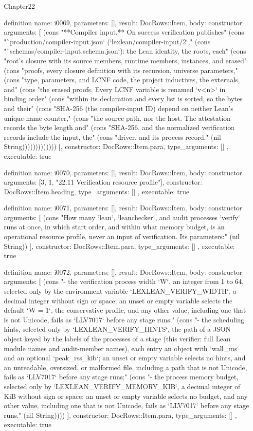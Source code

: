 \begin{lexlean}{Chapter22}
\begin{semanticmodule}
definition{
  name: i0069,
  parameters: [],
  result: DocRows::Item,
  body: constructor{
    arguments: [
      (cons "**Compiler input.** On success verification publishes" (cons "`production/compiler-input.json` (`lexlean/compiler-input/2`," (cons "`schemas/compiler-input.schema.json`): the Lean identity, the roots, each" (cons "root's closure with its source members, runtime members, instances, and erased" (cons "proofs, every closure definition with its recursion, universe parameters," (cons "type, parameters, and LCNF code, the project inductives, the externals, and" (cons "the erased proofs. Every LCNF variable is renamed `v<n>` in binding order" (cons "within its declaration and every list is sorted, so the bytes and their" (cons "SHA-256 (the compiler-input ID) depend on neither Lean's unique-name counter," (cons "the source path, nor the host. The attestation records the byte length and" (cons "SHA-256, and the normalized verification records include the input, the" (cons "driver, and its process record." (nil String)))))))))))))
    ],
    constructor: DocRows::Item.para,
    type_arguments: []
  },
  executable: true
}

definition{
  name: i0070,
  parameters: [],
  result: DocRows::Item,
  body: constructor{
    arguments: [3, 1, "22.11 Verification resource profile"],
    constructor: DocRows::Item.heading,
    type_arguments: []
  },
  executable: true
}

definition{
  name: i0071,
  parameters: [],
  result: DocRows::Item,
  body: constructor{
    arguments: [
      (cons "How many `lean`, `leanchecker`, and audit processes `verify` runs at once, in which start order, and within what memory budget, is an operational resource profile, never an input of verification. Its parameters:" (nil String))
    ],
    constructor: DocRows::Item.para,
    type_arguments: []
  },
  executable: true
}

definition{
  name: i0072,
  parameters: [],
  result: DocRows::Item,
  body: constructor{
    arguments: [
      (cons "- the verification process width `W`, an integer from 1 to 64, selected only by the environment variable `LEXLEAN_VERIFY_WIDTH`, a decimal integer without sign or space; an unset or empty variable selects the default `W = 1`, the conservative profile, and any other value, including one that is not Unicode, fails as `LLV7017` before any stage runs;" (cons "- the scheduling hints, selected only by `LEXLEAN_VERIFY_HINTS`, the path of a JSON object keyed by the labels of the processes of a stage (this verifier: full Lean module names and audit-member names), each entry an object with `wall_ms` and an optional `peak_rss_kib`; an unset or empty variable selects no hints, and an unreadable, oversized, or malformed file, including a path that is not Unicode, fails as `LLV7017` before any stage runs;" (cons "- the process memory budget, selected only by `LEXLEAN_VERIFY_MEMORY_KIB`, a decimal integer of KiB without sign or space; an unset or empty variable selects no budget, and any other value, including one that is not Unicode, fails as `LLV7017` before any stage runs." (nil String))))
    ],
    constructor: DocRows::Item.para,
    type_arguments: []
  },
  executable: true
}


\end{semanticmodule}
\end{lexlean}
